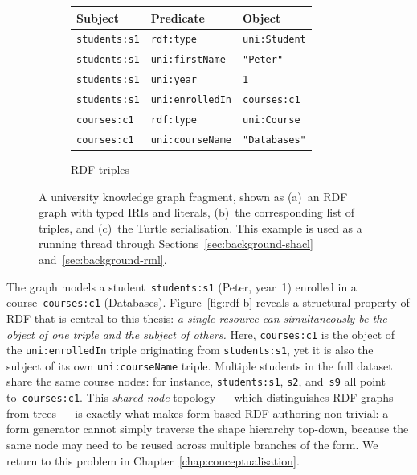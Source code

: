 \begin{figure}[htbp]

\begin{minipage}{0.4\textwidth}
    \raggerleft
\begin{subfigure}[b]{0.4\textwidth}
\centering
\footnotesize
\begin{tabular}{@{}lll@{}}
\toprule
\textbf{Subject} & \textbf{Predicate} & \textbf{Object} \\
\midrule
\texttt{students:s1} & \texttt{rdf:type}        & \texttt{uni:Student} \\
\texttt{students:s1} & \texttt{uni:firstName}   & \texttt{"Peter"} \\
\texttt{students:s1} & \texttt{uni:year}        & \texttt{1} \\
\texttt{students:s1} & \texttt{uni:enrolledIn}  & \texttt{courses:c1} \\
\texttt{courses:c1}  & \texttt{rdf:type}        & \texttt{uni:Course} \\
\texttt{courses:c1}  & \texttt{uni:courseName}  & \texttt{"Databases"} \\
\bottomrule
\end{tabular}
\caption{RDF triples}
\label{fig:rdf-c}

\end{subfigure}

\end{minipage}
\hfill
\begin{minipage}{0.55\textwidth}    
    \caption{%
      A university knowledge graph fragment, shown as
      (a)~an RDF graph with typed IRIs and literals,
      (b)~the corresponding list of triples, and
      (c)~the Turtle serialisation.
      This example is used as a running thread through
      Sections~\ref{sec:background-shacl} and~\ref{sec:background-rml}.
    }
\end{minipage}

\label{fig:rdf-example}

\end{figure}

The graph models a student~\texttt{students:s1} (Peter, year~1) enrolled in a course~\texttt{courses:c1} (Databases). Figure~\ref{fig:rdf-b} reveals a structural property of RDF that is central to this thesis: \emph{a single resource can simultaneously be the object of one triple and the subject of others.}
Here, \texttt{courses:c1} is the object of the \texttt{uni:enrolledIn} triple originating from \texttt{students:s1}, yet it is also the subject of its own \texttt{uni:courseName} triple. Multiple students in the full dataset share the same
course nodes: for instance, \texttt{students:s1}, \texttt{s2}, and~\texttt{s9} all point to~\texttt{courses:c1}. This \emph{shared-node}
topology — which distinguishes RDF graphs from trees — is exactly what makes form-based RDF authoring non-trivial: a form generator cannot simply traverse the shape hierarchy top-down, because the same node may need to be reused across multiple branches of the form. We return to this problem in Chapter~\ref{chap:conceptualisation}.

